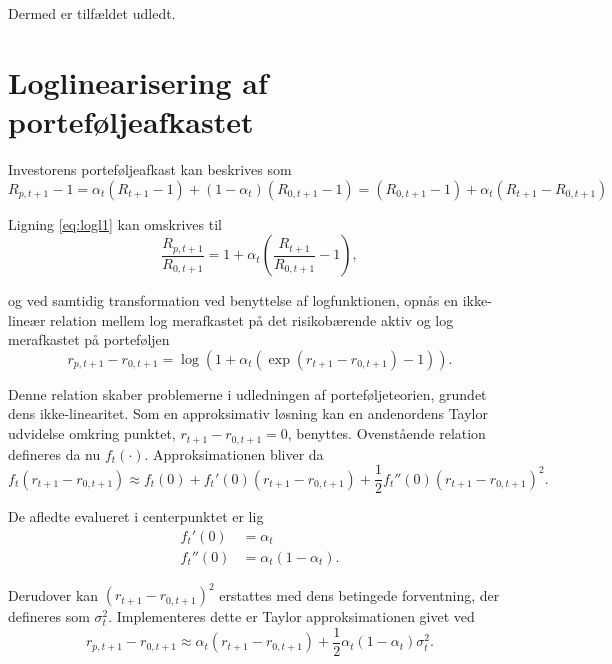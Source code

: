 \documentclass[
  a4paper,
  oneside]{memoir}
\begin{document}
Dermed er tilfældet udledt.

\hypertarget{loglinearisering-af-portefuxf8ljeafkastet}{%
\section{Loglinearisering af porteføljeafkastet}\label{loglinearisering-af-portefuxf8ljeafkastet}}

Investorens porteføljeafkast kan beskrives som
\begin{equation}
R_{p,t+1}-1 = \alpha_t(R_{t+1}- 1) + (1-\alpha_t)(R_{0,t+1}-1)=(R_{0,t+1} -1) + \alpha_t (R_{t+1} - R_{0,t+1}) \label{eq:logl1}
\end{equation}

Ligning \eqref{eq:logl1} kan omskrives til
\begin{equation}
\frac{R_{p,t+1}}{R_{0,t+1}} = 1 + \alpha_t \left(\frac{R_{t+1}}{R_{0,t+1}}-1\right), \label{eq:logl2}
\end{equation}

og ved samtidig transformation ved benyttelse af logfunktionen, opnås en ikke-lineær relation mellem log merafkastet på det risikobærende aktiv og log merafkastet på porteføljen
\begin{equation}
r_{p,t+1} - r_{0,t+1} = \log \left(1+\alpha_t (\exp(r_{t+1}-r_{0,t+1})-1)\right). \label{eq:logl3}
\end{equation}

Denne relation skaber problemerne i udledningen af porteføljeteorien, grundet dens ikke-linearitet. Som en approksimativ løsning kan en andenordens Taylor udvidelse omkring punktet, \(r_{t+1}-r_{0,t+1}=0\), benyttes. Ovenstående relation defineres da nu \(f_t(\cdot)\). Approksimationen bliver da
\begin{equation}
f_t(r_{t+1}-r_{0,t+1})\approx f_t(0) + f_t'(0)(r_{t+1}-r_{0,t+1})+\frac{1}{2}f_t''(0)(r_{t+1}-r_{0,t+1})^2. \label{eq:logl4}
\end{equation}

De afledte evalueret i centerpunktet er lig
\begin{align*}
f_t'(0) &= \alpha_t\\
f_t''(0) &= \alpha_t(1-\alpha_t).
\end{align*}

Derudover kan \((r_{t+1}-r_{0,t+1})^2\) erstattes med dens betingede forventning, der defineres som \(\sigma_t^2\). Implementeres dette er Taylor approksimationen givet ved
\begin{equation}
r_{p,t+1} - r_{0,t+1} \approx \alpha_t(r_{t+1} - r_{0,t+1}) + \frac{1}{2} \alpha_t(1-\alpha_t)\sigma_t^2. \label{eq:logl5}
\end{equation}
\end{document}
